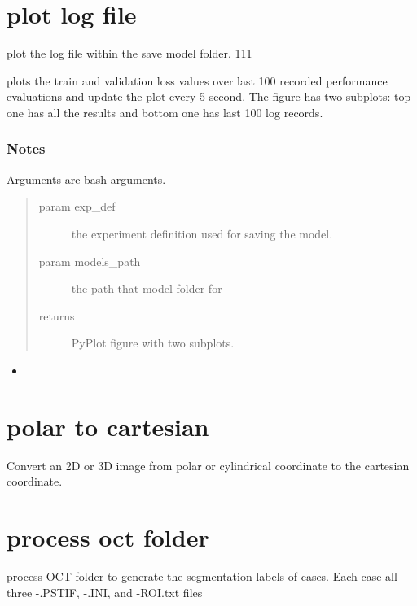 \documentclass[letterpaper,10pt,english]{sphinxmanual}
\begin{document}
\section{plot log file}
\label{\detokenize{index:module-util.plot_log_file}}\label{\detokenize{index:plot-log-file}}
plot the log file within the save model folder. 111

plots the train and validation loss values over last 100 recorded performance evaluations and update the
plot every 5 second.  The figure has two subplots: top one has all the results and bottom one has last 100 log
records.
\subsubsection*{Notes}

Arguments are bash arguments.
\begin{quote}\begin{description}
\item[{param exp\_def}] \leavevmode
the experiment definition used for saving the model.

\item[{param models\_path}] \leavevmode
the path that model folder for 

\item[{returns}] \leavevmode
PyPlot figure with two subplots.

\end{description}\end{quote}



\begin{itemize}
\item {} 

\end{itemize}




\section{polar to cartesian}
\label{\detokenize{index:module-util.polar2cartesian}}\label{\detokenize{index:polar-to-cartesian}}
Convert an 2D or 3D image from polar or cylindrical coordinate to the
cartesian coordinate.


\section{process oct folder}
\label{\detokenize{index:module-util.process_oct_folder}}\label{\detokenize{index:process-oct-folder}}
process OCT folder to generate the segmentation labels of cases. Each case all three -.PSTIF, -.INI, and -ROI.txt
files
\end{document}
